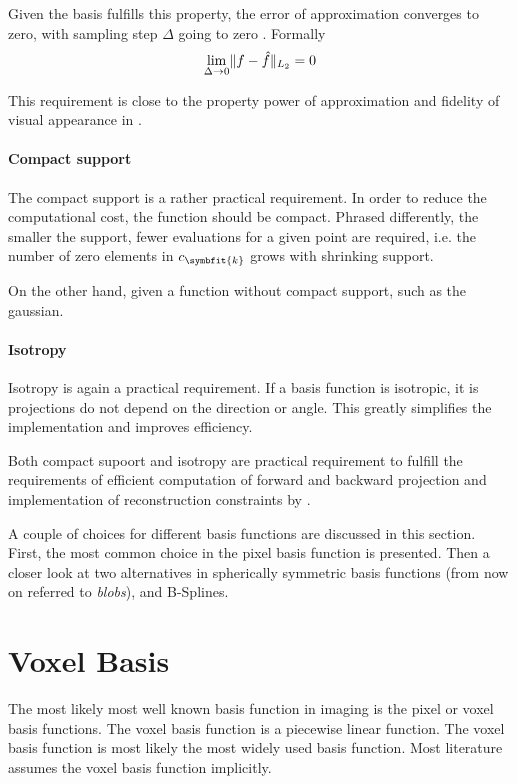 Given the basis fulfills this property, the error of approximation converges to zero, with sampling
step \(\Delta\) going to zero \cite{nilchian_optimized_2015}. Formally
\[ \lim_{\Delta \to 0} \lVert f - \hat{f}\rVert_{L_2} = 0 \]


This requirement is close to the property power of approximation and fidelity of visual
appearance in \cite{hanson_local_1985}.

\paragraph{Compact support}

The compact support is a rather practical requirement. In order to reduce the computational cost,
the function should be compact. Phrased differently, the smaller the support, fewer evaluations for
a given point are required, i.e. the number of zero elements in \(c_{\symbfit{k}}\) grows with
shrinking support.

On the other hand, given a function without compact support, such as the gaussian.

\paragraph{Isotropy}

Isotropy is again a practical requirement. If a basis function is isotropic, it is projections do
not depend on the direction or angle. This greatly simplifies the implementation and improves
efficiency.

Both compact supoort and isotropy are practical requirement to fulfill the requirements of efficient
computation of forward and backward projection and implementation of reconstruction constraints by
\cite{hanson_local_1985}.

A couple of choices for different basis functions are discussed in this section. First, the most
common choice in the pixel basis function is presented. Then a closer look at two alternatives in
spherically symmetric basis functions (from now on referred to \textit{blobs}), and B-Splines.

\section{Voxel Basis}\label{sec:voxel_basis}

The most likely most well known basis function in imaging is the pixel or voxel basis functions. The
voxel basis function is a piecewise linear function. The voxel basis function is most likely the
most widely used basis function. Most literature assumes the voxel basis function implicitly.

